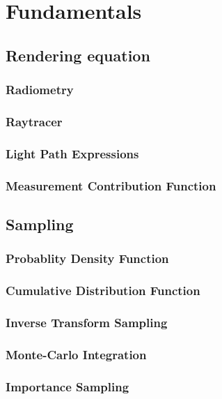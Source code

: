 \chapter{Fundamentals}
\label{ch:Fundamentals}


\section{Rendering equation}
\subsection{Radiometry}
\subsection{Raytracer}
\subsection{Light Path Expressions}
\subsection{Measurement Contribution Function}


\section{Sampling}

\subsection{Probablity Density Function}

\subsection{Cumulative Distribution Function}

\subsection{Inverse Transform Sampling}

\subsection{Monte-Carlo Integration}

\subsection{Importance Sampling}

